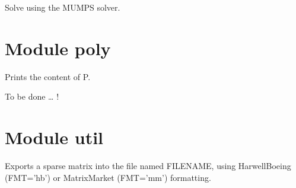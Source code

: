 \documentclass[a4paper,11pt,english]{sphinxmanual}
\begin{document}

\begin{fulllineitems}
\label{\detokenize{python/cmdref_Module linsolve:getfem.linsolve_mumps}}
Solve  using the MUMPS solver.

\end{fulllineitems}



\section{Module poly}
\label{\detokenize{python/cmdref_Module poly:module-poly}}\label{\detokenize{python/cmdref_Module poly::doc}}

\begin{fulllineitems}
\label{\detokenize{python/cmdref_Module poly:getfem.poly_print}}
Prints the content of P.

\end{fulllineitems}


\begin{fulllineitems}
\label{\detokenize{python/cmdref_Module poly:getfem.poly_product}}
To be done … !

\end{fulllineitems}



\section{Module util}
\label{\detokenize{python/cmdref_Module util:module-util}}\label{\detokenize{python/cmdref_Module util::doc}}

\begin{fulllineitems}
\label{\detokenize{python/cmdref_Module util:getfem.util_save_matrix}}
Exports a sparse matrix into the file named FILENAME, using
Harwell\sphinxhyphen{}Boeing (FMT=’hb’) or Matrix\sphinxhyphen{}Market (FMT=’mm’) formatting.

\end{fulllineitems}
\end{document}
